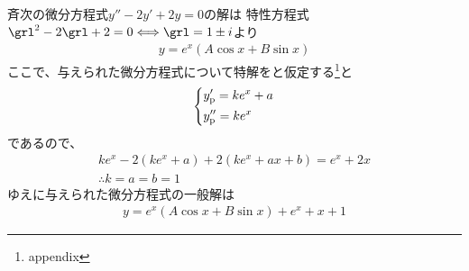 \begin{ans*}
  斉次の微分方程式$y'' - 2y' + 2y = 0$の解は
  特性方程式$\grl^2 - 2\grl + 2 = 0\Longleftrightarrow \grl = 1\pm i$より
  \begin{gather}
    y = e^x (A\cos x + B\sin x)
  \end{gather}
  ここで、与えられた微分方程式について特解をと仮定する\footnote{appendix}と
  \begin{gather}
    \begin{dcases*}
      y'_{\rm{p}} = ke^x + a \\
      y''_{\rm{p}} = ke^x
    \end{dcases*}
  \end{gather}
  であるので、
  \begin{gather}
    ke^x - 2(ke^x + a) + 2(ke^x + ax + b) = e^x + 2x \\
    \therefore k = a = b = 1
  \end{gather}
  ゆえに与えられた微分方程式の一般解は
  \begin{gather}
    y = e^x(A\cos x + B\sin x) + e^x + x + 1
  \end{gather}
\end{ans*}

\newpage
